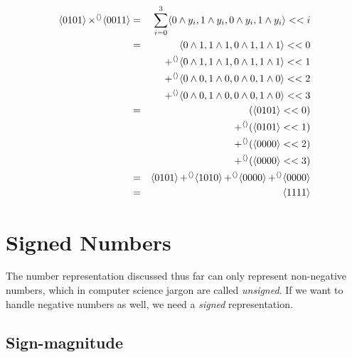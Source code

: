 \begin{example}[$5 \times 3$]
  \begin{align}
    \langle 0101 \rangle \operatorname{\times^{\langle\rangle}} \langle 0011 \rangle &=& \sum_{i=0}^{3} \langle 0 \land y_{i},1\land y_{i}, 0\land y_{i}, 1 \land y_{i} \rangle << i \\
                                              &=& \langle 0 \land 1,1\land 1, 0\land 1, 1 \land 1 \rangle << 0 \\\nonumber
                                              &&\operatorname{+^{\langle\rangle}} \langle 0 \land 1,1\land 1, 0\land 1, 1 \land 1 \rangle << 1 \\\nonumber
                                              &&\operatorname{+^{\langle\rangle}} \langle 0 \land 0,1\land 0, 0\land 0, 1 \land 0 \rangle << 2 \\\nonumber
                                              &&\operatorname{+^{\langle\rangle}} \langle 0 \land 0,1\land 0, 0\land 0, 1 \land 0 \rangle << 3 \\
                                              &=&         (\langle 0101 \rangle << 0) \\\nonumber
                                              &&\operatorname{+^{\langle\rangle}} (\langle 0101 \rangle << 1) \\\nonumber
                                              && \operatorname{+^{\langle\rangle}} (\langle 0000 \rangle << 2) \\\nonumber
                                              && \operatorname{+^{\langle\rangle}} (\langle 0000 \rangle << 3) \\
                                              &=& \langle 0101 \rangle \operatorname{+^{\langle\rangle}} \langle 1010 \rangle \operatorname{+^{\langle\rangle}} \langle 0000 \rangle  \operatorname{+^{\langle\rangle}} \langle 0000 \rangle \\
    &=& \langle 1111 \rangle
  \end{align}
\end{example}

\section{Signed Numbers}
\label{sec:signed-numbers}

The number representation discussed thus far can only represent
non-negative numbers, which in computer science jargon are called
\emph{unsigned}.  If we want to handle negative numbers as well, we
need a \emph{signed} representation.

\subsection{Sign-magnitude}
\label{sec:sign-magnitude}

